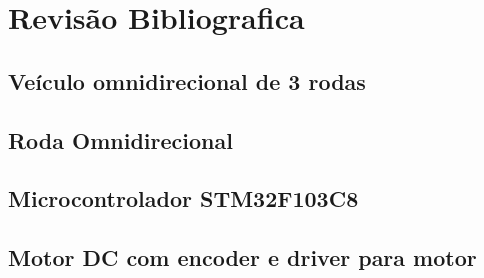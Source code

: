 
\chapter{Revisão Bibliografica}

\section{Veículo omnidirecional de 3 rodas}


\section{Roda Omnidirecional}


\section{Microcontrolador STM32F103C8}


\section{Motor DC com encoder e driver para motor}


